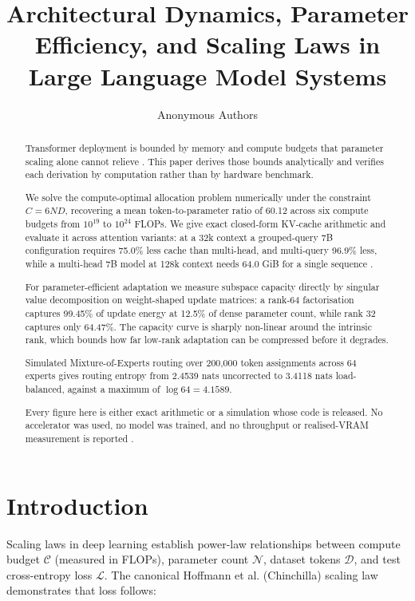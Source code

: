 \documentclass{article}
\title{Architectural Dynamics, Parameter Efficiency, and Scaling Laws in Large Language Model Systems}
\author{
  Anonymous Authors
}
\begin{document}
\maketitle

\begin{abstract}
Transformer deployment is bounded by memory and compute budgets that parameter scaling alone cannot relieve \cite{arxiv_2005_14165,arxiv_2406_00584}. This paper derives those bounds analytically and verifies each derivation by computation rather than by hardware benchmark.

We solve the compute-optimal allocation problem numerically under the constraint $C = 6ND$, recovering a mean token-to-parameter ratio of 60.12 across six compute budgets from $10^{19}$ to $10^{24}$ FLOPs. We give exact closed-form KV-cache arithmetic and evaluate it across attention variants: at a 32k context a grouped-query 7B configuration requires 75.0\% less cache than multi-head, and multi-query 96.9\% less, while a multi-head 7B model at 128k context needs 64.0 GiB for a single sequence \cite{arxiv_2404_01131}.

For parameter-efficient adaptation we measure subspace capacity directly by singular value decomposition on weight-shaped update matrices: a rank-64 factorisation captures 99.45\% of update energy at 12.5\% of dense parameter count, while rank 32 captures only 64.47\%. The capacity curve is sharply non-linear around the intrinsic rank, which bounds how far low-rank adaptation can be compressed before it degrades.

Simulated Mixture-of-Experts routing over 200{,}000 token assignments across 64 experts gives routing entropy from 2.4539 nats uncorrected to 3.4118 nats load-balanced, against a maximum of $\log 64 = 4.1589$.

Every figure here is either exact arithmetic or a simulation whose code is released. No accelerator was used, no model was trained, and no throughput or realised-VRAM measurement is reported \cite{crossref_10_1201_9788743808145_14}.
\end{abstract}






\section{Introduction}


Scaling laws in deep learning establish power-law relationships between compute budget $\mathcal{C}$ (measured in FLOPs), parameter count $\mathcal{N}$, dataset tokens $\mathcal{D}$, and test cross-entropy loss $\mathcal{L}$. The canonical Hoffmann et al. (Chinchilla) scaling law \cite{arxiv_2005_14165} demonstrates that loss follows:
\end{document}
